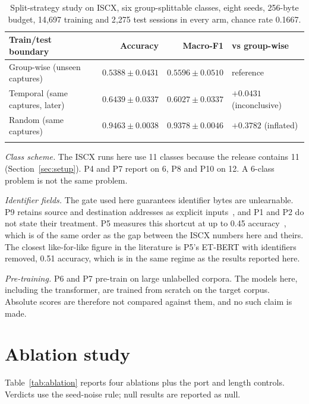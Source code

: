 \documentclass[pdflatex,sn-mathphys-num]{sn-jnl}
\theoremstyle{thmstyleone}%
\theoremstyle{thmstylethree}%
\begin{document}
\begin{table}[tbp]
\caption{Split-strategy study on ISCX, six group-splittable classes, eight
seeds, 256-byte budget, 14{,}697 training and 2{,}275 test sessions in every
arm, chance rate 0.1667.}\label{tab:split}
\begin{tabular}{@{}lrrl@{}}
\toprule
Train/test boundary & Accuracy & Macro-F1 & vs group-wise \\
\midrule
Group-wise (unseen captures) & $0.5388 \pm 0.0431$ & $0.5596 \pm 0.0510$ & reference \\
Temporal (same captures, later) & $0.6439 \pm 0.0337$ & $0.6027 \pm 0.0337$ & $+0.0431$ (inconclusive) \\
Random (same captures) & $0.9463 \pm 0.0038$ & $0.9378 \pm 0.0046$ & $\mathbf{+0.3782}$ (inflated) \\
\botrule
\end{tabular}
\end{table}


\emph{Class scheme.} The ISCX runs here use 11 classes because the release
contains 11 (Section~\ref{sec:setup}). P4 and P7 report on 6, P8 and P10 on 12.
A 6-class problem is not the same problem.

\emph{Identifier fields.} The gate used here guarantees identifier bytes
are unlearnable. P9 retains source and destination addresses as explicit
inputs~\cite{p9}, and P1 and P2 do not state their treatment. P5 measures this
shortcut at up to 0.45 accuracy~\cite{p5}, which is of the same order as the
gap between the ISCX numbers here and theirs. The closest like-for-like figure in
the literature is P5's ET-BERT with identifiers removed, 0.51 accuracy, which
is in the same regime as the results reported here.

\emph{Pre-training.} P6 and P7 pre-train on large unlabelled corpora. The
models here, including the transformer, are trained from scratch on the target
corpus. Absolute scores are therefore not compared against them, and no such
claim is made.

\section{Ablation study}\label{sec:ablation}

Table~\ref{tab:ablation} reports four ablations plus the port and length
controls. Verdicts use the seed-noise rule; null results are reported as null.
\end{document}
